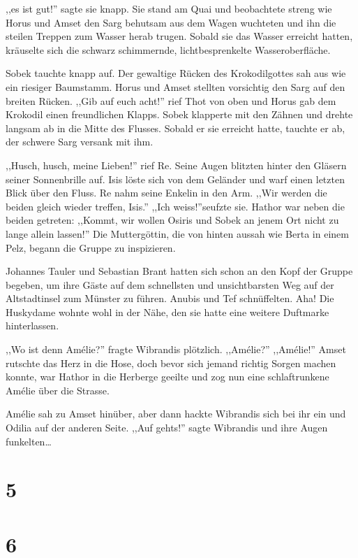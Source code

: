 ,,es ist gut!'' sagte sie knapp. Sie stand am Quai und beobachtete streng wie Horus und Amset den Sarg behutsam aus dem Wagen wuchteten und ihn die steilen Treppen zum Wasser herab trugen. Sobald sie das Wasser erreicht hatten, kräuselte sich die schwarz schimmernde, lichtbesprenkelte Wasseroberfläche.

Sobek tauchte knapp auf. Der gewaltige Rücken des Krokodilgottes sah aus wie ein riesiger Baumstamm. Horus und Amset stellten vorsichtig den Sarg auf den breiten Rücken. ,,Gib auf euch acht!'' rief Thot von oben und Horus gab dem Krokodil einen freundlichen Klapps. Sobek klapperte mit den Zähnen und drehte langsam ab in die Mitte des Flusses. Sobald er sie erreicht hatte, tauchte er ab, der schwere Sarg versank mit ihm.

,,Husch, husch, meine Lieben!'' rief Re. Seine Augen blitzten hinter den Gläsern seiner Sonnenbrille auf. Isis löste sich von dem Geländer und warf einen letzten Blick über den Fluss. Re nahm seine Enkelin in den Arm. ,,Wir werden die beiden gleich wieder treffen, Isis.'' ,,Ich weiss!''seufzte sie. Hathor war neben die beiden getreten: ,,Kommt, wir wollen Osiris und Sobek an jenem Ort nicht zu lange allein lassen!'' Die Muttergöttin, die von hinten aussah wie Berta in einem Pelz, begann die Gruppe zu inspizieren.

Johannes Tauler und Sebastian Brant hatten sich schon an den Kopf der Gruppe begeben, um ihre Gäste auf dem schnellsten und unsichtbarsten Weg auf der Altstadtinsel zum Münster zu führen. Anubis und Tef schnüffelten. Aha! Die Huskydame wohnte wohl in der Nähe, den sie hatte eine weitere Duftmarke hinterlassen.

,,Wo ist denn Amélie?'' fragte Wibrandis plötzlich. ,,Amélie?'' ,,Amélie!'' Amset rutschte das Herz in die Hose, doch bevor sich jemand richtig Sorgen machen konnte, war Hathor in die Herberge geeilte und zog nun eine schlaftrunkene Amélie über die Strasse. 

Amélie sah zu Amset hinüber, aber dann hackte Wibrandis sich bei ihr ein und Odilia auf der anderen Seite. ,,Auf gehts!'' sagte Wibrandis und ihre Augen funkelten\dots 

\section*{5}

\section*{6}

